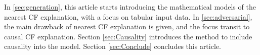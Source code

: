 In \autoref{sec:generation}, this article starts introducing the mathematical models of the nearest CF explanation, with a focus on tabular input data. In \autoref{sec:adversarial}, the main drawback of nearest CF explanation is given, and the focus transit to causal CF explanation. Section \ref{sec:Causality} introduces the method to include causality into the model. Section \ref{sec:Conclude} concludes this article.


